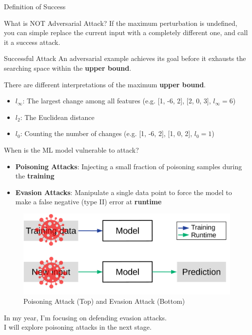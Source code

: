 \documentclass[9pt]{beamer}
\begin{document}
\begin{frame}{Definition of Success}
\begin{alertblock}{What is NOT Adversarial Attack?}
If the maximum perturbation is undefined, you can simple replace the current input with a completely different one, and call it a success attack. 
\end{alertblock}

\begin{block}{Successful Attack}
An adversarial example achieves its goal before it exhausts the searching space within the \textbf{upper bound}.
\end{block}

There are different interpretations of the maximum \textbf{upper bound}.

\begin{itemize}
    \item \textbf{$l_\infty$}: The largest change among all features (e.g. [1, -6, 2], [2, 0, 3], $l_\infty = 6$)
    \item \textbf{$l_2$}: The Euclidean distance 
    \item \textbf{$l_0$}: Counting the number of changes (e.g. [1, -6, 2], [1, 0, 2], $l_0 = 1$)
\end{itemize}
\end{frame}

\begin{frame}{When is the ML model vulnerable to attack?}
\begin{itemize}
    \item \textbf{Poisoning Attacks}: Injecting a small fraction of poisoning samples during the \textbf{training}
    \item \textbf{Evasion Attacks}: Manipulate a single data point to force the model to make a false negative (type II) error at \textbf{runtime}
\end{itemize}

\begin{figure}
    \centering
    \small
    \includegraphics[width=0.8\linewidth]{images/attack_models.pdf}
    \caption{Poisoning Attack (Top) and Evasion Attack (Bottom)}
    \label{fig:surrogate}
\end{figure}

In my  year, I'm focusing on defending evasion attacks. \\
I will explore poisoning attacks in the next stage.

\end{frame}
\end{document}
